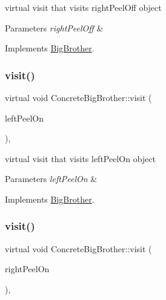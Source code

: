 virtual visit that visits right\+Peel\+Off object 
\begin{DoxyParams}{Parameters}
{\em right\+Peel\+Off} & \\
\hline
\end{DoxyParams}


Implements \mbox{\hyperlink{class_big_brother_a2da409f26a8ecda1b6d63ed295dc732d}{Big\+Brother}}.

\mbox{\label{class_concrete_big_brother_ad936670c1591d213dda894fd72e87421}} 
\subsubsection{\texorpdfstring{visit()}{visit()}\hspace{0.1cm}{\footnotesize\ttfamily [5/7]}}
{\footnotesize\ttfamily virtual void Concrete\+Big\+Brother\+::visit (\begin{DoxyParamCaption}\item[{\mbox{\hyperlink{class_left_peel_on}{Left\+Peel\+On}} $\ast$}]{left\+Peel\+On }\end{DoxyParamCaption})\hspace{0.3cm}{\ttfamily [inline]}, {\ttfamily [virtual]}}

virtual visit that visits left\+Peel\+On object 
\begin{DoxyParams}{Parameters}
{\em left\+Peel\+On} & \\
\hline
\end{DoxyParams}


Implements \mbox{\hyperlink{class_big_brother_a22ee539312b1b56ef51e3a22a05f70d5}{Big\+Brother}}.

\mbox{\label{class_concrete_big_brother_aca0d91bd7605b59f9aaa2baf9763ceb3}} 
\subsubsection{\texorpdfstring{visit()}{visit()}\hspace{0.1cm}{\footnotesize\ttfamily [6/7]}}
{\footnotesize\ttfamily virtual void Concrete\+Big\+Brother\+::visit (\begin{DoxyParamCaption}\item[{\mbox{\hyperlink{class_right_peel_on}{Right\+Peel\+On}} $\ast$}]{right\+Peel\+On }\end{DoxyParamCaption})\hspace{0.3cm}{\ttfamily [inline]}, {\ttfamily [virtual]}}

